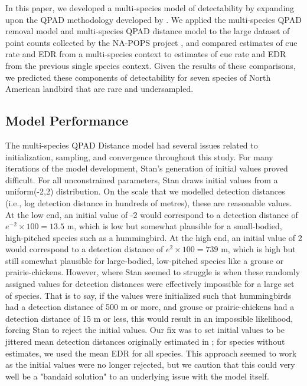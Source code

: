 \documentclass[12pt]{article}
\begin{document}
\par In this paper, we developed a multi-species model of detectability by expanding upon the QPAD methodology developed by \citet{solymos_calibrating_2013}.
We applied the multi-species QPAD removal model and multi-species QPAD distance model to the large dataset of point counts collected by the NA-POPS project \citep{edwards_point_2023}, and compared estimates of cue rate and EDR from a multi-species context to estimates of cue rate and EDR from the previous single species context.
Given the results of these comparisons, we predicted these components of detectability for seven species of North American landbird that are rare and undersampled.

\subsection{Model Performance}

\par The multi-species QPAD Distance model had several issues related to initialization, sampling, and convergence throughout this study.
For many iterations of the model development, Stan's generation of initial values proved difficult.
For all unconstrained parameters, Stan draws initial values from a uniform(-2,2) distribution.
On the scale that we modelled detection distances (i.e., log detection distance in hundreds of metres), these are reasonable values.
At the low end, an initial value of -2 would correspond to a detection distance of $e^{-2} \times 100 = 13.5$ m, which is low but somewhat plausible for a small-bodied, high-pitched species such as a hummingbird.
At the high end, an initial value of 2 would correspond to a detection distance of $e^{2} \times 100 = 739$ m, which is high but still somewhat plausible for large-bodied, low-pitched species like a grouse or prairie-chickens.
However, where Stan seemed to struggle is when these randomly assigned values for detection distances were effectively impossible for a large set of species.
That is to say, if the values were initialized such that hummingbirds had a detection distance of 500 m or more, and grouse or prairie-chickens had a detection distance of 15 m or less, this would result in an impossible likelihood, forcing Stan to reject the initial values.
Our fix was to set initial values to be jittered mean detection distances originally estimated in \citet{edwards_point_2023}; for species without estimates, we used the mean EDR for all species.
This approach seemed to work as the initial values were no longer rejected, but we caution that this could very well be a "bandaid solution" to an underlying issue with the model itself.
\end{document}
